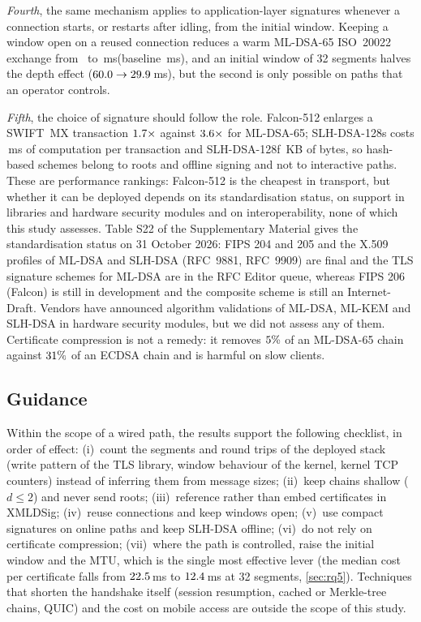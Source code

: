 \documentclass[preprint,12pt]{elsarticle}
\newcommand{\ms}{\,ms\xspace}
\newcommand{\KB}{\,KB\xspace}
\newcommand{\supp}[1]{#1 of the Supplementary Material}
\begin{document}
\emph{Fourth}, the same mechanism applies to application-layer signatures whenever a connection starts, or restarts after idling, from the initial window. Keeping a window open on a reused connection reduces a warm ML-DSA-65 ISO~20022 exchange from \idleWarmML\ to \busyWarmML\ms (baseline \busyWarmBase\ms), and an initial window of 32 segments halves the depth effect ($60.0\to29.9$\ms), but the second is only possible on paths that an operator controls.

\emph{Fifth}, the choice of signature should follow the role. Falcon-512 enlarges a SWIFT~MX transaction $1.7\times$ against $3.6\times$ for ML-DSA-65; SLH-DSA-128s costs \slhsCpuMs\ms of computation per transaction and SLH-DSA-128f \swiftKBSLHf\KB of bytes, so hash-based schemes belong to roots and offline signing and not to interactive paths. These are performance rankings: Falcon-512 is the cheapest in transport, but whether it can be deployed depends on its standardisation status, on support in libraries and hardware security modules and on interoperability, none of which this study assesses. \supp{Table S22} gives the standardisation status on 31 October 2026: FIPS 204 and 205 and the X.509 profiles of ML-DSA and SLH-DSA (RFC~9881, RFC~9909) are final and the TLS signature schemes for ML-DSA are in the RFC Editor queue, whereas FIPS 206 (Falcon) is still in development and the composite scheme is still an Internet-Draft. Vendors have announced algorithm validations of ML-DSA, ML-KEM and SLH-DSA in hardware security modules, but we did not assess any of them. Certificate compression is not a remedy: it removes $5\%$ of an ML-DSA-65 chain against $31\%$ of an ECDSA chain and is harmful on slow clients.

\subsection{Guidance}
Within the scope of a wired path, the results support the following checklist, in order of effect: (i)~count the segments and round trips of the deployed stack (write pattern of the TLS library, window behaviour of the kernel, kernel TCP counters) instead of inferring them from message sizes; (ii)~keep chains shallow ($d\le2$) and never send roots; (iii)~reference rather than embed certificates in XMLDSig; (iv)~reuse connections and keep windows open; (v)~use compact signatures on online paths and keep SLH-DSA offline; (vi)~do not rely on certificate compression; (vii)~where the path is controlled, raise the initial window and the MTU, which is the single most effective lever (the median cost per certificate falls from $22.5$\ms to $12.4$\ms at 32 segments, \cref{sec:rq5}). Techniques that shorten the handshake itself (session resumption, cached or Merkle-tree chains, QUIC) and the cost on mobile access are outside the scope of this study.
\end{document}
